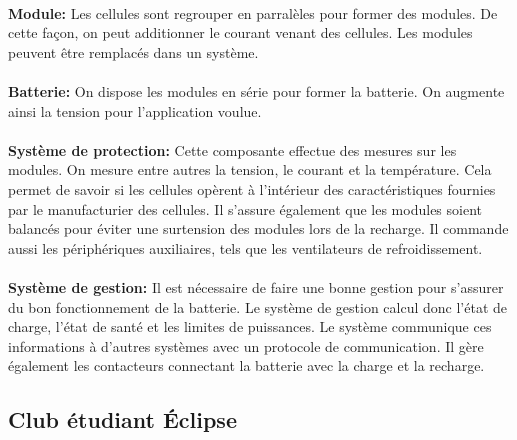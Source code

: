 		\paragraph{}
		\textbf{Module:} Les cellules sont regrouper en parralèles pour former des modules. De cette façon, on peut additionner le courant venant des cellules. Les modules peuvent être remplacés dans un système.
		
		\paragraph{}
		\textbf{Batterie:} On dispose les modules en série pour former la batterie. On augmente ainsi la tension pour l'application voulue.
		
		\paragraph{}
		\textbf{Système de protection:} Cette composante effectue des mesures sur les modules. On mesure entre autres la tension, le courant et la température. Cela permet de savoir si les cellules opèrent à l'intérieur des caractéristiques fournies par le manufacturier des cellules. Il s'assure également que les modules soient balancés pour éviter une surtension des modules lors de la recharge. Il commande aussi les périphériques auxiliaires, tels que les ventilateurs de refroidissement.
			
			
		\paragraph{}
		\textbf{Système de gestion:} Il est nécessaire de faire une bonne gestion pour s'assurer du bon fonctionnement de la batterie. Le système de gestion calcul donc l'état de charge, l'état de santé et les limites de puissances. Le système communique ces informations à d'autres systèmes avec un protocole de communication. Il gère également les contacteurs connectant la batterie avec la charge et la recharge.
			
		

	
		
	\subsection{Club étudiant Éclipse}
		
